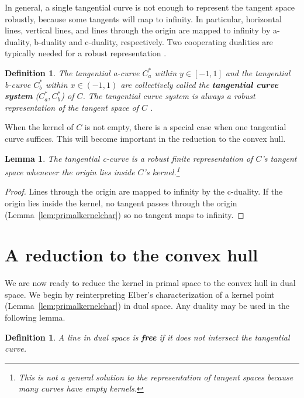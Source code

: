 \documentclass{sig-alternate}
\newtheorem{lemma}[theorem]{Lemma}
\newtheorem{defn2}[theorem]{Definition}
\begin{document}
In general, a single tangential curve is not enough to represent the tangent space robustly,
because some tangents will map to infinity.
In particular, horizontal lines, vertical
lines, and lines through the origin are mapped to infinity by a-duality, b-duality
and c-duality, respectively.
Two cooperating dualities are typically needed for a robust representation
\cite{jj01}.

\begin{defn2}
\label{defn:tcsystem}
The tangential a-curve $C^*_a$ within $y \in [-1,1]$ and
the tangential b-curve $C^*_b$ within $x \in (-1,1)$ are collectively 
called the {\bf tangential curve system} 
($C_a^*, C_b^*$) of $C$.
The tangential curve system is always a robust representation of the tangent space of $C$ \cite{jj01,jj02}.
\end{defn2}

When the kernel of $C$ is not empty, there is a special case
when one tangential curve suffices.
This will become important in the reduction to the convex hull.

\begin{lemma}
\label{lem:crobust}
The tangential c-curve is a robust finite representation of $C$'s tangent space
whenever the origin lies inside $C$'s kernel.\footnote{This 
	is not a general solution to the representation of tangent spaces
	because many curves have empty kernels.}
\end{lemma}
\begin{proof}
Lines through the origin are mapped to infinity by the c-duality.
If the origin lies inside the kernel,
no tangent passes through the origin (Lemma~\ref{lem:primalkernelchar})
so no tangent maps to infinity.
\end{proof}


\section{A reduction to the convex hull}
\label{sec:reduction}

We are now ready to reduce the kernel in primal space to the convex hull in dual space.
We begin by reinterpreting Elber's characterization of a kernel point 
(Lemma~\ref{lem:primalkernelchar}) in dual space.
Any duality may be used in the following lemma.

\begin{defn2}
A line in dual space is {\bf free} if it does not intersect the tangential curve.
\end{defn2}
\end{document}
